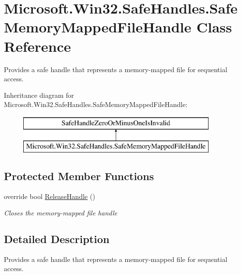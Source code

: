 \hypertarget{class_microsoft_1_1_win32_1_1_safe_handles_1_1_safe_memory_mapped_file_handle}{}\section{Microsoft.\+Win32.\+Safe\+Handles.\+Safe\+Memory\+Mapped\+File\+Handle Class Reference}
\label{class_microsoft_1_1_win32_1_1_safe_handles_1_1_safe_memory_mapped_file_handle}


Provides a safe handle that represents a memory-\/mapped file for sequential access.  


Inheritance diagram for Microsoft.\+Win32.\+Safe\+Handles.\+Safe\+Memory\+Mapped\+File\+Handle\+:\begin{figure}[H]
\begin{center}
\leavevmode
\includegraphics[height=2.000000cm]{class_microsoft_1_1_win32_1_1_safe_handles_1_1_safe_memory_mapped_file_handle}
\end{center}
\end{figure}
\subsection*{Protected Member Functions}
\begin{DoxyCompactItemize}
\item 
override bool \hyperlink{class_microsoft_1_1_win32_1_1_safe_handles_1_1_safe_memory_mapped_file_handle_a9644ed711aae6ae944b6a785eb40e59e}{Release\+Handle} ()
\begin{DoxyCompactList}\small\item\em Closes the memory-\/mapped file handle \end{DoxyCompactList}\end{DoxyCompactItemize}


\subsection{Detailed Description}
Provides a safe handle that represents a memory-\/mapped file for sequential access. 



